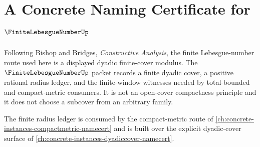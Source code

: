 \chapter{A Concrete Naming Certificate for $\FiniteLebesgueNumberUp$}
\label{ch:concrete-instances-finite-lebesgue-number-namecert}

Following Bishop and Bridges, \emph{Constructive Analysis}, the finite Lebesgue-number route used here is a displayed dyadic finite-cover modulus. The $\FiniteLebesgueNumberUp$ packet records a finite dyadic cover, a positive rational radius ledger, and the finite-window witnesses needed by total-bounded and compact-metric consumers. It is not an open-cover compactness principle and it does not choose a subcover from an arbitrary family.

The finite radius ledger is consumed by the compact-metric route of \autoref{ch:concrete-instances-compactmetric-namecert} and is built over the explicit dyadic-cover surface of \autoref{ch:concrete-instances-dyadiccover-namecert}.

